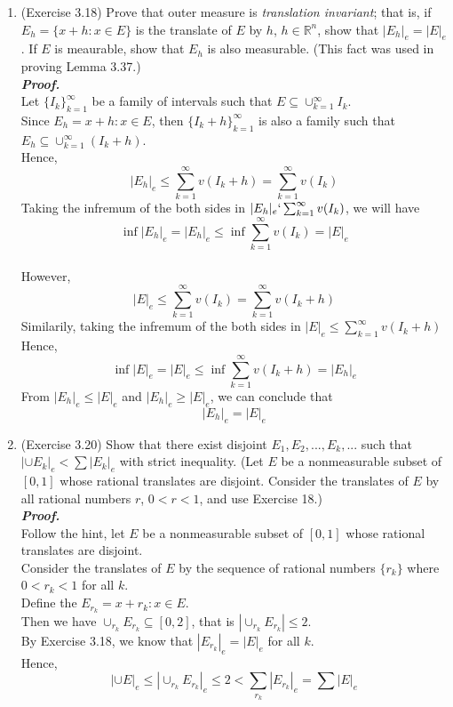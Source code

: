 \documentclass[a4paper,11pt]{article}
\begin{document}
\begin{enumerate}
\item (Exercise 3.18) Prove that outer measure is \textit{translation invariant}; that is, if $E_h = \{ x + h : x \in E \}$ is the translate of $E$ by $h$, $h \in \mathbb{R}^n$, show that $|E_h|_e = |E|_e$. If $E$ is meaurable, show that $E_h$ is also measurable. (This fact was used in proving Lemma 3.37.)\\
\newline
\textit{\textbf {Proof.}}\\
Let $\{ I_k \}_{k=1}^{\infty}$ be a family of intervals such that $E \subseteq \cup_{k=1}^{\infty} I_k$.\\
Since $E_h = {x+h : x \in E}$, then $\{I_k + h\}_{k=1}^{\infty}$ is also a family such that $E_h \subseteq \cup_{k=1}^{\infty} (I_k + h)$.\\
Hence,
$$|E_h|_e \leq \sum_{k=1}^{\infty} v(I_k + h) = \sum_{k=1}^{\infty} v(I_k)$$
Taking the infremum of the both sides in $|E_h|_e \lq \sum_{k=1}^{\infty} v(I_k)$, we will have
$$\inf |E_h|_e = |E_h|_e \leq \inf \sum_{k=1}^{\infty} v(I_k) = |E|_e$$\\
However,
$$|E|_e \leq \sum_{k=1}^{\infty} v(I_k) = \sum_{k=1}^{\infty} v(I_k+h)$$
Similarily, taking the infremum of the both sides in $|E|_e \leq \sum_{k=1}^{\infty} v(I_k+h)$
Hence,
$$\inf |E|_e = |E|_e \leq \inf \sum_{k=1}^{\infty} v(I_k+h) = |E_h|_e$$
From $|E_h|_e \leq |E|_e$ and $|E_h|_e \geq |E|_e$, we can conclude that
$$|E_h|_e = |E|_e$$
\newline




\item (Exercise 3.20) Show that there exist disjoint $E_1, E_2,...,E_k,...$ such that $|\cup E_k|_e < \sum |E_k|_e$ with strict inequality. (Let $E$ be a nonmeasurable subset of $[0, 1]$ whose rational translates are disjoint. Consider the translates of $E$ by all rational numbers $r$, $0 < r < 1$, and use Exercise 18.)\\
\newline
\textit{\textbf {Proof.}}\\
Follow the hint, let $E$ be a nonmeasurable subset of $[0, 1]$ whose rational translates are disjoint.\\
Consider the translates of $E$ by the sequence of rational numbers $\{ r_k \}$ where $0 < r_k < 1$ for all $k$.\\
Define the $E_{r_k} = {x + r_k : x \in E}$.\\
Then we have $\cup_{r_k} E_{r_k} \subseteq [0,2]$, that is $|\cup_{r_k} E_{r_k}| \leq 2$.\\
By Exercise 3.18, we know that $|E_{r_k}|_e = |E|_e$ for all $k$.\\
Hence,
$$|\cup E|_e \leq |\cup_{r_k} E_{r_k}|_e \leq 2 < \sum_{r_k} |E_{r_k}|_e = \sum |E|_e$$\\





\end{enumerate}
\end{document}

